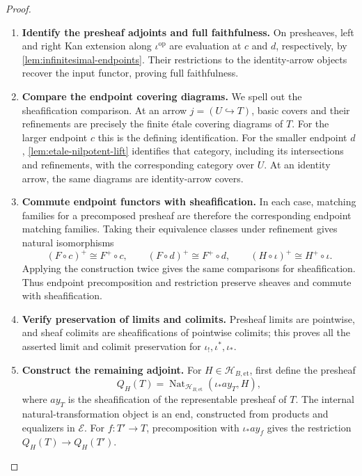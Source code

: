 \documentclass[11pt,a4paper]{article}
\numberwithin{algorithm}{section}
\numberwithin{equation}{section}
\theoremstyle{definition}
\theoremstyle{remark}
\theoremstyle{plain}
\newcommand{\E}{\mathcal E}
\newcommand{\ThickEt}{\mathscr H_{B,\mathrm{et}}}
\theoremstyle{definition}
\theoremstyle{plain}
\begin{document}
\begin{proof}\leavevmode
\begin{enumerate}[leftmargin=*,align=left]
\item \textbf{Identify the presheaf adjoints and full faithfulness.}
On presheaves, left and right Kan extension along
$\iota^{\mathrm{op}}$ are evaluation at $c$ and $d$,
respectively, by \cref{lem:infinitesimal-endpoints}.  Their
restrictions to the identity-arrow objects recover the input
functor, proving full faithfulness.

\item \textbf{Compare the endpoint covering diagrams.}
We spell out the sheafification comparison. At an arrow
$j=(U\hookrightarrow T)$, basic covers and their refinements
are precisely the finite \'etale covering diagrams of $T$.
For the larger endpoint $c$ this is the defining identification.
For the smaller endpoint $d$, \cref{lem:etale-nilpotent-lift}
identifies that category, including its intersections and
refinements, with the corresponding category over $U$.
At an identity arrow, the same diagrams are identity-arrow
covers.

\item \textbf{Commute endpoint functors with sheafification.}
In each case, matching families for a precomposed
presheaf are therefore the corresponding endpoint matching
families. Taking their equivalence classes under refinement
gives natural isomorphisms
\[
 (F\circ c)^+\cong F^+\circ c,\qquad
 (F\circ d)^+\cong F^+\circ d,\qquad
 (H\circ\iota)^+\cong H^+\circ\iota.
\]
 Applying the construction
twice gives the same comparisons for sheafification.
Thus endpoint precomposition and restriction preserve sheaves
and commute with sheafification.

\item \textbf{Verify preservation of limits and colimits.}
Presheaf limits are pointwise,
and sheaf colimits are sheafifications of pointwise colimits;
this proves all the asserted limit and colimit preservation
for $\iota_!,\iota^*,\iota_*$.

\item \textbf{Construct the remaining adjoint.}
For $H\in\ThickEt$, first define the presheaf
\[
 Q_H(T)=
 \operatorname{Nat}_{\ThickEt}(\iota_*a y_T,H),
\]
where $a y_T$ is the sheafification of the representable
presheaf of $T$. The internal natural-transformation object is
an end, constructed from products and equalizers in $\E$.
For $f:T'\to T$, precomposition with $\iota_*a y_f$ gives
the restriction $Q_H(T)\to Q_H(T')$.


\end{enumerate}
\end{proof}
\end{document}
